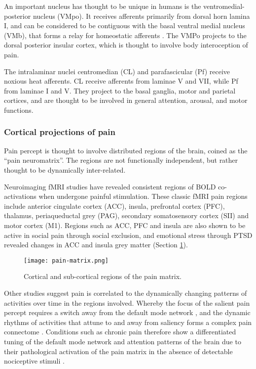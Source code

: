 An important nucleus has thought to be unique in humans is the ventromedial-posterior nucleus (VMpo)\cite{Willis2002,Craig2014}. It receives afferents primarily from dorsal horn lamina I, and can be considered to be contiguous with the basal ventral medial nucleus (VMb), that forms a relay for homeostatic afferents \cite{Craig2003}. The VMPo projects to the dorsal posterior insular cortex, which is thought to involve body interoception of pain. 

The intralaminar nuclei centromedian (CL) and parafascicular (Pf) receive noxious heat afferents. CL receive afferents from laminae V and VII, while Pf from laminae I and V. They project to the basal ganglia, motor and parietal cortices, and are thought to be involved in general attention, arousal, and motor functions. 

\subsubsection{Cortical projections of pain}\label{section:neuromatrix}

Pain percept is thought to involve distributed regions of the brain, coined as the “pain neuromatrix”\cite{Melzack1999a}. The regions are not functionally independent, but rather thought to be dynamically inter-related. 

Neuroimaging fMRI studies \cite{Apkarian2013c,Wager2013,Davis2012a} have revealed consistent regions of BOLD co-activations when undergone painful stimulation. These classic fMRI pain regions include anterior cingulate cortex (ACC), insula, prefrontal cortex (PFC), thalamus, periaqueductal grey (PAG), secondary somatosensory cortex (SII) and motor cortex (M1). 
Regions such as ACC, PFC and insula are also shown to be active in social pain through social exclusion, and emotional stress through PTSD revealed changes in ACC and insula grey matter (Section \ref{fig:pain-matrix}).

 \begin{figure}[ht]
 \texttt{[image: pain-matrix.png]}
 \centering
 \caption{Cortical and sub-cortical regions of the pain matrix.} 
 \label{fig:pain-matrix}
 \end{figure}
 
Other studies suggest pain is correlated to the dynamically changing patterns of activities over time in the regions involved. Whereby the focus of the salient pain percept requires a switch away from the default mode network \cite{Kucyi2013}, and the dynamic rhythms of activities that attune to and away from saliency forms a complex pain connectome \cite{Kucyi2015}. Conditions such as chronic pain therefore show a differentiated tuning of the default mode network and attention patterns of the brain due to their pathological activation of the pain matrix in the absence of detectable nociceptive stimuli \cite{Baliki2008,Legrain2009}.

